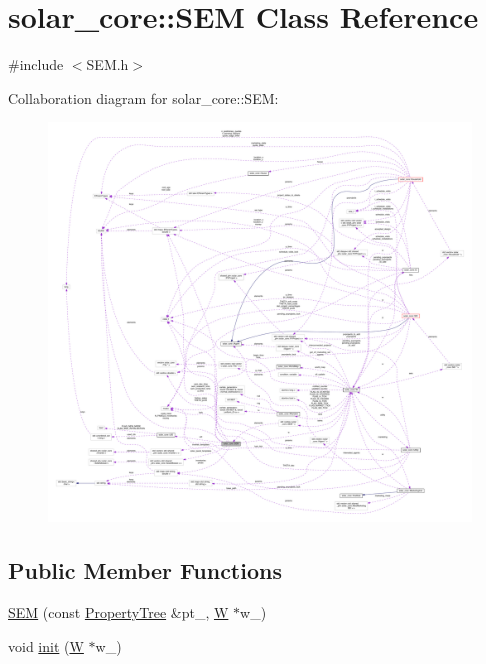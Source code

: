 \hypertarget{classsolar__core_1_1_s_e_m}{}\section{solar\+\_\+core\+:\+:S\+E\+M Class Reference}
\label{classsolar__core_1_1_s_e_m}


{\ttfamily \#include $<$S\+E\+M.\+h$>$}



Collaboration diagram for solar\+\_\+core\+:\+:S\+E\+M\+:
\nopagebreak
\begin{figure}[H]
\begin{center}
\leavevmode
\includegraphics[width=350pt]{classsolar__core_1_1_s_e_m__coll__graph}
\end{center}
\end{figure}
\subsection*{Public Member Functions}
{\bf }\par
\begin{DoxyCompactItemize}
\item 
\hyperlink{classsolar__core_1_1_s_e_m_a60d13fcadec26853d8461d32eefb97da}{S\+E\+M} (const \hyperlink{namespacesolar__core_adeda2737d6938c190eb774a5b2495045}{Property\+Tree} \&pt\+\_\+, \hyperlink{classsolar__core_1_1_w}{W} $\ast$w\+\_\+)
\item 
void \hyperlink{classsolar__core_1_1_s_e_m_a33c9571de22adca46acb3759f4f4e82e}{init} (\hyperlink{classsolar__core_1_1_w}{W} $\ast$w\+\_\+)
\end{DoxyCompactItemize}

